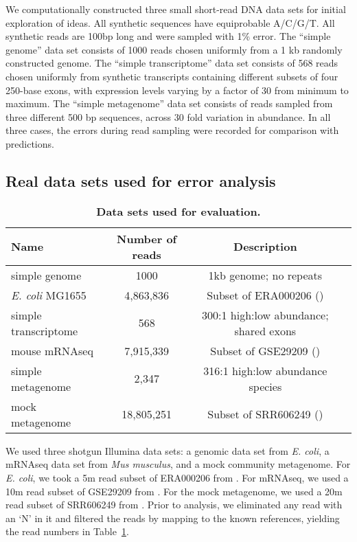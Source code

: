 We computationally constructed three small short-read DNA data sets for initial
exploration of ideas.  All synthetic sequences have equiprobable A/C/G/T.  All
synthetic reads are 100bp long and were sampled with 1\% error.  The ``simple
genome'' data set consists of 1000 reads chosen uniformly from a 1 kb randomly
constructed genome. The ``simple transcriptome'' data set consists of 568 reads
chosen uniformly from synthetic transcripts containing different subsets of
four 250-base exons, with expression levels varying by a factor of 30 from
minimum to maximum.  The ``simple metagenome'' data set consists of reads
sampled from three different 500 bp sequences, across 30 fold variation in
abundance.  In all three cases, the errors during read sampling were recorded
for comparison with predictions.

\subsection{Real data sets used for error analysis}


\begin{table}
\centering
\resizebox{16cm}{!} {
\begin{tabular}{|l|c|c|l|}
\hline
Name & Number of reads & Description \\
\hline
simple genome & 1000 & 1kb genome; no repeats \\
{\em E. coli} MG1655 & 4,863,836 & Subset of ERA000206 (\cite{chitsaz}) \\
simple transcriptome & 568 & 300:1 high:low abundance; shared exons \\
mouse mRNAseq & 7,915,339 & Subset of GSE29209 (\cite{trinityrna}) \\
simple metagenome & 2,347 & 316:1 high:low abundance species \\
mock metagenome & 18,805,251 & Subset of SRR606249 (\cite{podar}) \\
\hline
\end{tabular}
}
\caption{{\bf Data sets used for evaluation.}}

\label{tab:data}
\end{table}



We used three shotgun Illumina data sets: a genomic data set from {\em E.
coli}, a mRNAseq data set from {\em Mus musculus}, and a mock community
metagenome.  For {\em E. coli}, we took a 5m read subset of ERA000206 from
\cite{chitsaz}.  For mRNAseq, we used a 10m read subset of GSE29209 from
\cite{trinityrna}.  For the mock metagenome, we used a 20m read subset of
SRR606249 from \cite{podar}.  Prior to analysis, we eliminated any read with an
`N' in it and filtered the reads by mapping to the known references, yielding
the read numbers in Table~\ref{tab:data}.

